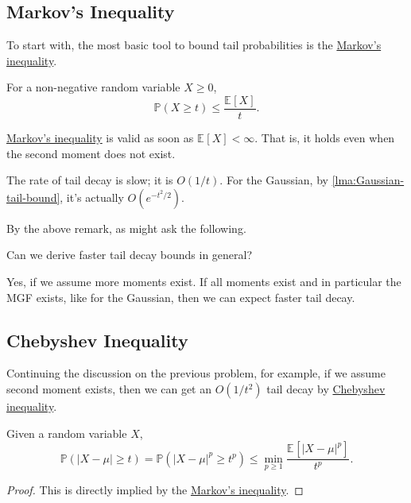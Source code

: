 \subsection{Markov's Inequality}
To start with, the most basic tool to bound tail probabilities is the \hyperref[lma:Markov-inequality]{Markov's inequality}.

\begin{lemma}\label{lma:Markov-inequality}
  For a non-negative random variable \(X \geq 0\),
  \[
    \mathbb{P} (X \geq t) \leq \frac{\mathbb{E}_{}\left[X \right] }{t}.
  \]
\end{lemma}

\begin{note}
  \hyperref[lma:Markov-inequality]{Markov's inequality} is valid as soon as \(\mathbb{E}_{}\left[X \right] < \infty \). That is, it holds even when the second moment does not exist.
\end{note}

\begin{remark}
  The rate of tail decay is slow; it is \(O(1 / t)\). For the Gaussian, by \autoref{lma:Gaussian-tail-bound}, it's actually \(O(e^{-t^2 / 2})\).
\end{remark}

By the above remark, as might ask the following.

\begin{problem*}
  Can we derive faster tail decay bounds in general?
\end{problem*}
\begin{answer}
  Yes, if we assume more moments exist. If all moments exist and in particular the MGF exists, like for the Gaussian, then we can expect faster tail decay.
\end{answer}

\subsection{Chebyshev Inequality}
Continuing the discussion on the previous problem, for example, if we assume second moment exists, then we can get an \(O(1 / t^2)\) tail decay by \hyperref[lma:Chebyshev-inequality]{Chebyshev inequality}.

\begin{lemma}\label{lma:Chebyshev-inequality}
  Given a random variable \(X\),
  \[
    \mathbb{P} (\vert X - \mu  \vert \geq t ) = \mathbb{P} (\vert X - \mu  \vert^p \geq t ^p) \leq \min _{p \geq 1} \frac{\mathbb{E}_{}\left[\vert X-\mu  \vert^p \right] }{t^p}.
  \]
\end{lemma}
\begin{proof}
  This is directly implied by the \hyperref[lma:Markov-inequality]{Markov's inequality}.
\end{proof}

